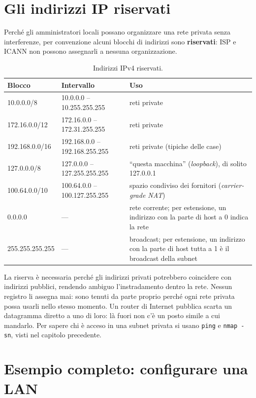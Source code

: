 \section{Gli indirizzi IP riservati}

Perché gli amministratori locali possano organizzare una rete privata senza interferenze, per convenzione alcuni blocchi di
indirizzi sono \textbf{riservati}: ISP e ICANN non possono assegnarli a nessuna organizzazione.

\begin{table}[H]
\centering
\begin{tabular}{llp{7.5cm}}
\toprule
\textbf{Blocco} & \textbf{Intervallo} & \textbf{Uso} \\
\midrule
10.0.0.0/8 & 10.0.0.0 -- 10.255.255.255 & reti private \\
172.16.0.0/12 & 172.16.0.0 -- 172.31.255.255 & reti private \\
192.168.0.0/16 & 192.168.0.0 -- 192.168.255.255 & reti private (tipiche delle case) \\
127.0.0.0/8 & 127.0.0.0 -- 127.255.255.255 & ``questa macchina'' (\emph{loopback}), di solito 127.0.0.1 \\
100.64.0.0/10 & 100.64.0.0 -- 100.127.255.255 & spazio condiviso dei fornitori (\emph{carrier-grade NAT}) \\
0.0.0.0 & --- & rete corrente; per estensione, un indirizzo con la parte di host a 0 indica la rete \\
255.255.255.255 & --- & broadcast; per estensione, un indirizzo con la parte di host tutta a 1 è il broadcast della subnet \\
\bottomrule
\end{tabular}
\caption{Indirizzi IPv4 riservati.}
\end{table}

La riserva è necessaria perché gli indirizzi privati potrebbero coincidere con indirizzi pubblici, rendendo ambiguo
l'instradamento dentro la rete. Nessun registro li assegna mai: sono tenuti da parte proprio perché ogni rete privata possa
usarli nello stesso momento. Un router di Internet pubblica scarta un datagramma diretto a uno di loro: là fuori non c'è un
posto simile a cui mandarlo. Per sapere chi è acceso in una subnet privata si usano \texttt{ping} e \texttt{nmap -sn}, visti
nel capitolo precedente.

\section{Esempio completo: configurare una LAN}

